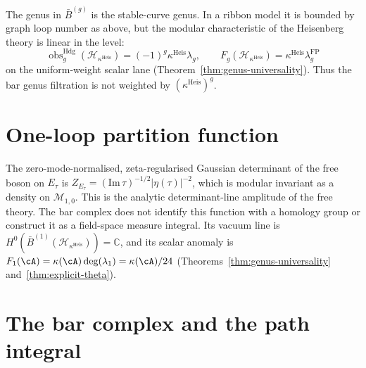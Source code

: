 The genus in $\bar{B}^{(g)}$ is the stable-curve genus.  In a ribbon
model it is bounded by graph loop number as above, but the
modular characteristic of the Heisenberg theory is linear in the
level:
\[
\operatorname{obs}^{\mathrm{Hdg}}_g
(\mathcal{H}_{\kappa^{\mathrm{Heis}}})
=(-1)^g\kappa^{\mathrm{Heis}}\lambda_g,\qquad
F_g(\mathcal{H}_{\kappa^{\mathrm{Heis}}})
=\kappa^{\mathrm{Heis}}\lambda_g^{\mathrm{FP}}
\]
on the uniform-weight scalar lane (Theorem~\ref{thm:genus-universality}).
Thus the bar genus filtration is not weighted by
$(\kappa^{\mathrm{Heis}})^g$.

\section{One-loop partition function}

The zero-mode-normalised, zeta-regularised Gaussian determinant of the
free boson on $E_\tau$ is
$Z_{E_\tau} = (\mathrm{Im}\,\tau)^{-1/2} |\eta(\tau)|^{-2}$,
which is modular invariant as a density on $\mathcal{M}_{1,0}$.
This is the analytic determinant-line amplitude of the free theory.
The bar complex does not identify this function with a homology group
or construct it as a field-space measure integral. Its vacuum line is
$H^0(\bar{B}^{(1)}(\mathcal{H}_{\kappa^{\mathrm{Heis}}}))=\mathbb{C}$,
and its scalar anomaly is
$F_1(\cA)=\kappa(\cA)\deg(\lambda_1)=\kappa(\cA)/24$
(Theorems~\ref{thm:genus-universality}
and~\ref{thm:explicit-theta}).

\section{The bar complex and the path integral}

